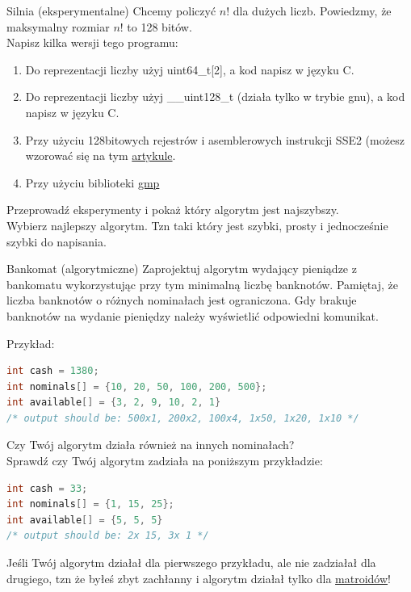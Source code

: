 \begin{exercise}{Silnia (eksperymentalne)}{}
Chcemy policzyć $n!$ dla dużych liczb. Powiedzmy, że maksymalny rozmiar $n!$ to 128 bitów. \\
Napisz kilka wersji tego programu:
\begin{enumerate}
    \item Do reprezentacji liczby użyj uint64\_t[2], a kod napisz w języku C.
    \item Do reprezentacji liczby użyj \_\_uint128\_t (działa tylko w trybie gnu), a kod napisz w języku C.
    \item Przy użyciu 128bitowych rejestrów i asemblerowych instrukcji SSE2 (możesz wzorować się na tym \href{https://stackoverflow.com/questions/51271161/why-is-gcc-o3-auto-vectorizing-factorial-that-many-extra-instructions-looks-wo}{artykule}.
    \item Przy użyciu biblioteki \href{https://gmplib.org/}{gmp}
\end{enumerate}

Przeprowadź eksperymenty i pokaż który algorytm jest najszybszy. \\
Wybierz najlepszy algorytm. Tzn taki który jest szybki, prosty i jednocześnie szybki do napisania.
\end{exercise}

\begin{exercise}{Bankomat (algorytmiczne)}{}
Zaprojektuj algorytm wydający pieniądze z bankomatu wykorzystując przy tym minimalną liczbę banknotów. Pamiętaj, że liczba banknotów o różnych nominałach jest ograniczona. Gdy brakuje banknotów na wydanie pieniędzy należy wyświetlić odpowiedni komunikat.

Przykład:
\begin{lstlisting}[language=C,style=C99]
int cash = 1380;
int nominals[] = {10, 20, 50, 100, 200, 500};
int available[] = {3, 2, 9, 10, 2, 1}
/* output should be: 500x1, 200x2, 100x4, 1x50, 1x20, 1x10 */
\end{lstlisting}

Czy Twój algorytm działa również na innych nominałach? \\
Sprawdź czy Twój algorytm zadziała na poniższym przykładzie:
\begin{lstlisting}[language=C,style=C99]
int cash = 33;
int nominals[] = {1, 15, 25};
int available[] = {5, 5, 5} 
/* output should be: 2x 15, 3x 1 */
\end{lstlisting}
Jeśli Twój algorytm działał dla pierwszego przykładu, ale nie zadziałał dla drugiego, tzn że byłeś zbyt zachłanny i algorytm działał tylko dla \href{https://en.wikipedia.org/wiki/Matroid}{matroidów}!
\end{exercise}

